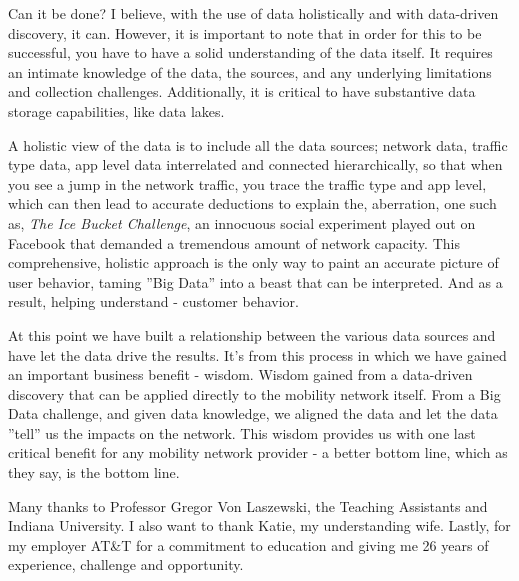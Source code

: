 \documentclass[sigconf]{acmart}
\begin{document}
Can it be done?   I believe, with the use of data holistically and with data-driven discovery, it can. However, it is important to note that in order for this to be successful, you have to have a solid understanding of the data itself.  It requires an intimate knowledge of the data, the sources, and any underlying limitations and collection challenges.  Additionally, it is critical to have substantive data storage capabilities, like data lakes. 

A holistic view of the data is to include all the data sources; network data, traffic type data, app level data interrelated and connected hierarchically, so that when you see a jump in the network traffic, you trace the traffic type and app level, which can then lead to accurate deductions to explain the, aberration, one such as, {\em The Ice Bucket Challenge}, an innocuous social experiment played out on Facebook that demanded a tremendous amount of network capacity.  This comprehensive, holistic approach is the only way to paint an accurate picture of user behavior, taming ''Big Data'' into a beast that can be interpreted.  And as a result, helping understand - customer behavior.  

At this point we have built a relationship between the various data sources and have let the data drive the results.  It's from this process in which we have gained an important business benefit - wisdom.  Wisdom gained from a data-driven discovery that can be applied directly to the mobility network itself. From a Big Data challenge, and given data knowledge, we aligned the data and let the data ''tell'' us the impacts on the network.  This wisdom provides us with one last critical benefit for any mobility network provider - a better bottom line, which as they say, is the bottom line.

\begin{acks}

Many thanks to Professor Gregor Von Laszewski, the Teaching Assistants and Indiana University.  I also want to thank Katie, my understanding wife.  Lastly, for my employer AT\&T for a commitment to education and giving me 26 years of experience, challenge and opportunity.

\end{acks}




 


\end{document}

